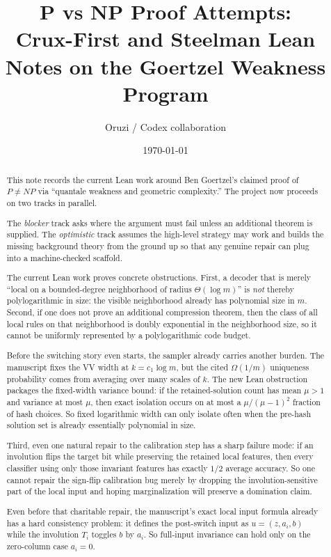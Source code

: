 \documentclass[11pt]{article}
\title{P vs NP Proof Attempts:\\
Crux-First and Steelman Lean Notes on the Goertzel Weakness Program}
\author{Oruzi / Codex collaboration}
\date{\today}
\theoremstyle{remark}
\begin{document}
\maketitle

\begin{abstract}
This note records the current Lean work around Ben Goertzel's claimed proof of
$P \neq NP$ via ``quantale weakness and geometric complexity.''  The project now
proceeds on two tracks in parallel.

The \emph{blocker} track asks where the argument must fail unless an additional theorem
is supplied.  The \emph{optimistic} track assumes the high-level strategy may work and
builds the missing background theory from the ground up so that any genuine repair can
plug into a machine-checked scaffold.

The current Lean work proves concrete obstructions.  First, a decoder that is merely
``local on a bounded-degree neighborhood of radius $\Theta(\log m)$'' is \emph{not} thereby
polylogarithmic in size: the visible neighborhood already has polynomial size in $m$.
Second, if one does not prove an additional compression theorem, then the class of all local
rules on that neighborhood is doubly exponential in the neighborhood size, so it cannot be
uniformly represented by a polylogarithmic code budget.

Before the switching story even starts, the sampler already carries another burden.  The
manuscript fixes the VV width at \(k=c_1\log m\), but the cited \(\Omega(1/m)\) uniqueness
probability comes from averaging over many scales of \(k\).  The new Lean obstruction packages the
fixed-width variance bound: if the retained-solution count has mean \(\mu>1\) and variance at most
\(\mu\), then exact isolation occurs on at most a \(\mu/(\mu-1)^2\) fraction of hash choices.
So fixed logarithmic width can only isolate often when the pre-hash solution set is already
essentially polynomial in size.

Third, even one natural repair to the calibration step has a sharp failure mode: if an
involution flips the target bit while preserving the retained local features, then every
classifier using only those invariant features has exactly \(1/2\) average accuracy.  So one
cannot repair the sign-flip calibration bug merely by dropping the involution-sensitive part of
the local input and hoping marginalization will preserve a domination claim.

Even before that charitable repair, the manuscript's exact local input formula already has a hard
consistency problem: it defines the post-switch input as \(u=(z,a_i,b)\) while the involution
\(T_i\) toggles \(b\) by \(a_i\).  So full-input invariance can hold only on the zero-column case
\(a_i=0\).


\end{abstract}
\end{document}
